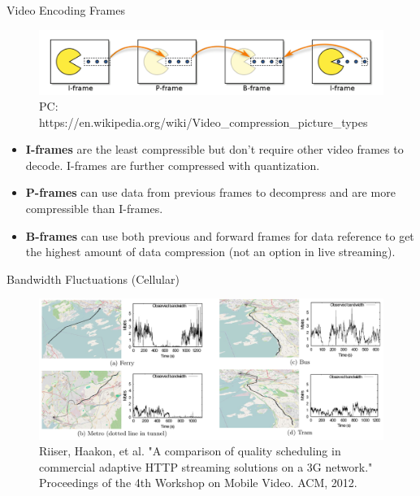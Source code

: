 \begin{frame}{Video Encoding Frames}
  \begin{figure}
    \includegraphics[width=\textwidth]{figures/video-frames.pdf}
    \caption{PC: https://en.wikipedia.org/wiki/Video\_compression\_picture\_types}
  \end{figure}

  \begin{itemize}
  \item \textbf{I-frames} are the least compressible but don't require other
    video frames to decode. I-frames are further compressed with
    quantization.
  \item \textbf{P-frames} can use data from previous frames to decompress
    and are more compressible than I-frames.
  \item \textbf{B-frames} can use both previous and forward frames for data
    reference to get the highest amount of data compression (not an option
    in live streaming).
  \end{itemize}
\end{frame}

\begin{frame}{Bandwidth Fluctuations (Cellular)}
  \begin{figure}
    \includegraphics[width=\textwidth]{figures/bandwidth-cellular.pdf}
    \caption{Riiser, Haakon, et al. "A comparison of quality scheduling in
      commercial adaptive HTTP streaming solutions on a 3G network."
      Proceedings of the 4th Workshop on Mobile Video. ACM, 2012.}
  \end{figure}
\end{frame}

